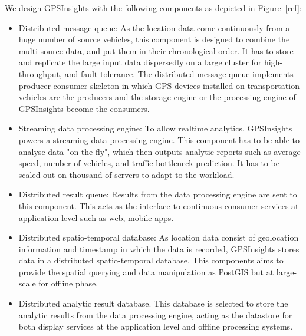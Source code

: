\documentclass{acm_proc_article-sp}
\begin{document}

We design GPSInsights with the following components as depicted  in Figure~[ref]:

\begin{itemize}
\item 	Distributed message queue: As the location data come continuously from a huge number of source vehicles, this component is designed to combine the multi-source data, and put them in their chronological order. It has to store and replicate the large input data dispersedly on a large cluster for high-throughput, and fault-tolerance. The distributed message queue implements producer-consumer skeleton in which GPS devices installed on transportation vehicles are the producers and the storage engine or the processing engine of GPSInsights become the consumers.

\item  Streaming data processing engine: To allow realtime analytics, GPSInsights powers a streaming data processing engine. This component has to be able to analyse data "on the fly", which then outputs analytic reports such as average speed, number of vehicles, and traffic bottleneck prediction. It has to be scaled out on thousand of servers to adapt to the workload.

\item  Distributed result queue: Results from the data processing engine are sent to this component. This acts as the interface to continuous consumer services at application level such as web, mobile apps. 

\item  Distributed spatio-temporal database: As location data consist of geolocation information and timestamp in which the data is recorded, GPSInsights stores data in a distributed spatio-temporal database. This components aims to provide the spatial querying and data manipulation as PostGIS but at large-scale for offline phase. 

\item  Distributed analytic result database. This database is selected to store the analytic results from the data processing engine, acting as the datastore for both display services at the application level and offline processing systems. 

\end{itemize}
\end{document}
